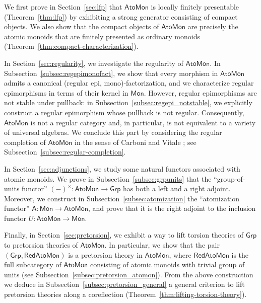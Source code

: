 \documentclass[a4paper,10pt,reqno]{amsart}
\theoremstyle{definition}
\theoremstyle{remark}
\newcommand{\AtoMon}{\mathsf{AtoMon}}
\newcommand{\RedAtoMon}{\mathsf{RedAtoMon}}
\newcommand{\Mon}{\mathsf{Mon}}
\newcommand{\Grp}{\mathsf{Grp}}
\newcommand{\At}{\mathsf A}
\begin{document}
We first prove in Section~\ref{sec:lfp} that $\AtoMon$ is locally finitely presentable (Theorem~\ref{thm:lfp}) by exhibiting a strong generator consisting of compact objects. We also show that the compact objects of $\AtoMon$ are precisely the atomic monoids that are finitely presented as ordinary monoids (Theorem~\ref{thm:compact-characterization}).

In Section~\ref{sec:regularity}, we investigate the regularity of $\AtoMon$. In Subsection~\ref{subsec:regepimonofact}, we show that every morphism in $\AtoMon$ admits a canonical (regular epi, mono)-factorization, and we characterize regular epimorphisms in terms of their kernel in $\Mon$. However, regular epimorphisms are not stable under pullback: in Subsection~\ref{subsec:regepi_notstable}, we explicitly construct a regular epimorphism whose pullback is not regular. Consequently, $\AtoMon$ is not a regular category and, in particular, is not equivalent to a variety of universal algebras. We conclude this part by considering the regular completion of $\AtoMon$ in the sense of Carboni and Vitale \cite{CarboniVitale}; see Subsection~\ref{subsec:regular-completion}.

In Section~\ref{sec:adjunctions}, we study some natural functors associated with atomic monoids. We prove in Subsection~\ref{subsec:grpunits} that the ``group-of-units functor'' $(-)^\times\colon \AtoMon\to\Grp$ has both a left and a right adjoint. Moreover, we construct in Subsection~\ref{subsec:atomization} the ``atomization functor'' $\At\colon \Mon \to \AtoMon$, and prove that it is the right adjoint to the inclusion functor $U\colon \AtoMon\to\Mon$.

Finally, in Section~\ref{sec:pretorsion}, we exhibit a way to lift torsion theories of $\Grp$ to pretorsion theories of $\AtoMon$. In particular, we show that the pair $(\Grp, \RedAtoMon)$ is a pretorsion theory in $\AtoMon$, where $\RedAtoMon$ is the full subcategory of $\AtoMon$ consisting of atomic monoids with trivial group of units (see Subsection~\ref{subsec:pretorsion_atomon}). From the above construction we deduce in Subsection~\ref{subsec:pretorsion_general} a general criterion to lift pretorsion theories along a coreflection (Theorem~\ref{thm:lifting-torsion-theory}).
\end{document}
